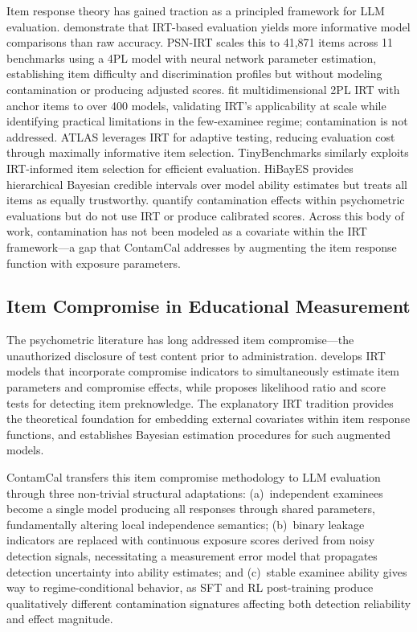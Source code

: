 Item response theory has gained traction as a principled framework for LLM evaluation. \citet{lalor2024irt} demonstrate that IRT-based evaluation yields more informative model comparisons than raw accuracy. PSN-IRT \citep{gu2026psnirt} scales this to 41,871 items across 11 benchmarks using a 4PL model with neural network parameter estimation, establishing item difficulty and discrimination profiles but without modeling contamination or producing adjusted scores. \citet{polo2026growing} fit multidimensional 2PL IRT with anchor items to over 400 models, validating IRT's applicability at scale while identifying practical limitations in the few-examinee regime; contamination is not addressed. ATLAS \citep{lyu2025atlas} leverages IRT for adaptive testing, reducing evaluation cost through maximally informative item selection. TinyBenchmarks \citep{polo2024tinybenchmarks} similarly exploits IRT-informed item selection for efficient evaluation. HiBayES \citep{zhuang2025hibayes} provides hierarchical Bayesian credible intervals over model ability estimates but treats all items as equally trustworthy. \citet{han2026probing} quantify contamination effects within psychometric evaluations but do not use IRT or produce calibrated scores. Across this body of work, contamination has not been modeled as a covariate within the IRT framework---a gap that ContamCal addresses by augmenting the item response function with exposure parameters.

\subsection{Item Compromise in Educational Measurement}
\label{sec:related:edumeasure}

The psychometric literature has long addressed item compromise---the unauthorized disclosure of test content prior to administration. \citet{eckerly2017} develops IRT models that incorporate compromise indicators to simultaneously estimate item parameters and compromise effects, while \citet{sinharay2017} proposes likelihood ratio and score tests for detecting item preknowledge. The explanatory IRT tradition \citep{deboeck2004,adams1997} provides the theoretical foundation for embedding external covariates within item response functions, and \citet{mislevy1986} establishes Bayesian estimation procedures for such augmented models.

ContamCal transfers this item compromise methodology to LLM evaluation through three non-trivial structural adaptations: (a)~independent examinees become a single model producing all responses through shared parameters, fundamentally altering local independence semantics; (b)~binary leakage indicators are replaced with continuous exposure scores derived from noisy detection signals, necessitating a measurement error model \citep{maris2009} that propagates detection uncertainty into ability estimates; and (c)~stable examinee ability gives way to regime-conditional behavior, as SFT and RL post-training produce qualitatively different contamination signatures affecting both detection reliability and effect magnitude.

